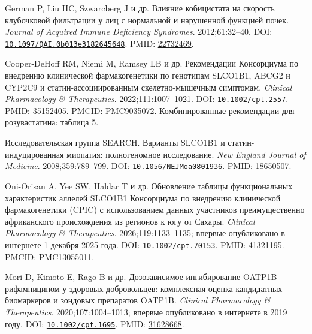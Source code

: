 \documentclass[11pt]{article}
\begin{document}
\begin{description}[before={\microtypesetup{expansion=false}\setlength{\RaggedRightRightskip}{0pt plus 4em}\RaggedRight}]
\item[{[33]}] German P, Liu HC, Szwarcberg J и др. Влияние кобицистата на скорость клубочковой фильтрации у лиц с нормальной и нарушенной функцией почек. \textit{\foreignlanguage{english}{Journal of Acquired Immune Deficiency Syndromes}}. 2012;61:32--40. DOI: \href{https://doi.org/10.1097/QAI.0b013e3182645648}{\nolinkurl{10.1097/QAI.0b013e3182645648}}. PMID: \href{https://pubmed.ncbi.nlm.nih.gov/22732469/}{22732469}.
\item[{[34]}] Cooper-DeHoff RM, Niemi M, Ramsey LB и др. Рекомендации Консорциума по внедрению клинической фармакогенетики по генотипам SLCO1B1, ABCG2 и CYP2C9 и статин-ассоциированным скелетно-мышечным симптомам. \textit{\foreignlanguage{english}{Clinical Pharmacology \& Therapeutics}}. 2022;111:1007--1021. DOI: \href{https://doi.org/10.1002/cpt.2557}{\nolinkurl{10.1002/cpt.2557}}. PMID: \href{https://pubmed.ncbi.nlm.nih.gov/35152405/}{35152405}. PMCID: \href{https://pmc.ncbi.nlm.nih.gov/articles/PMC9035072/}{PMC9035072}. Комбинированные рекомендации для розувастатина: таблица 5.
\item[{[35]}] Исследовательская группа SEARCH. Варианты SLCO1B1 и статин-индуцированная миопатия: полногеномное исследование. \textit{\foreignlanguage{english}{New England Journal of Medicine}}. 2008;359:789--799. DOI: \href{https://doi.org/10.1056/NEJMoa0801936}{\nolinkurl{10.1056/NEJMoa0801936}}. PMID: \href{https://pubmed.ncbi.nlm.nih.gov/18650507/}{18650507}.
\item[{[36]}] Oni-Orisan A, Yee SW, Haldar T и др. Обновление таблицы функциональных характеристик аллелей SLCO1B1 Консорциума по внедрению клинической фармакогенетики (CPIC) с использованием данных участников преимущественно африканского происхождения из регионов к югу от Сахары. \textit{\foreignlanguage{english}{Clinical Pharmacology \& Therapeutics}}. 2026;119:1133--1135; впервые опубликовано в интернете 1 декабря 2025 года. DOI: \href{https://doi.org/10.1002/cpt.70153}{\nolinkurl{10.1002/cpt.70153}}. PMID: \href{https://pubmed.ncbi.nlm.nih.gov/41321195/}{41321195}. PMCID: \href{https://pmc.ncbi.nlm.nih.gov/articles/PMC13055011/}{PMC13055011}.
\item[{[37]}] Mori D, Kimoto E, Rago B и др. Дозозависимое ингибирование OATP1B рифампицином у здоровых добровольцев: комплексная оценка кандидатных биомаркеров и зондовых препаратов OATP1B. \textit{\foreignlanguage{english}{Clinical Pharmacology \& Therapeutics}}. 2020;107:1004--1013; впервые опубликовано в интернете в 2019 году. DOI: \href{https://doi.org/10.1002/cpt.1695}{\nolinkurl{10.1002/cpt.1695}}. PMID: \href{https://pubmed.ncbi.nlm.nih.gov/31628668/}{31628668}.

\end{description}
\end{document}
